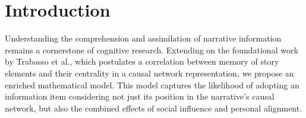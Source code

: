 \documentclass[sn-mathphys,Numbered]{sn-jnl}%
\theoremstyle{thmstyleone}%
\theoremstyle{thmstyletwo}%
\theoremstyle{thmstylethree}%
\begin{document}
% 
% 
% 




\maketitle

\section{Introduction}
Understanding the comprehension and assimilation of narrative information remains a cornerstone of cognitive research. Extending on the foundational work by Trabasso et al., which postulates a correlation between memory of story elements and their centrality in a causal network representation, we propose an enriched mathematical model. This model captures the likelihood of adopting an information item considering not just its position in the narrative's causal network, but also the combined effects of social influence and personal alignment.
\end{document}
